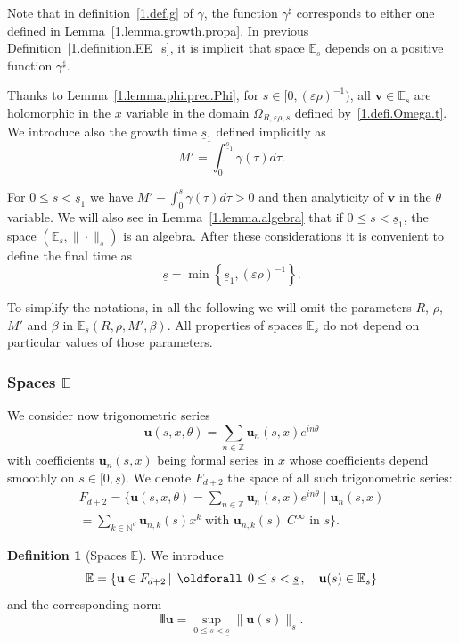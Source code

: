 \documentclass[10pt]{amsart}
\theoremstyle{definition}
\newtheorem{defi}[cdrthm]{Definition}
\theoremstyle{plain}
\newcommand*\e{\varepsilon}
\newcommand*\N{{\mathbb N}}
\newcommand*\Z{{\mathbb Z}}
\newcommand*\EE{{\mathbb E}}
\newcommand*\g{\gamma}
\newcommand{\ubf}{{\mathbf u}}
\newcommand{\vbf}{{\mathbf v}}
\newcommand*\und{\underline}
\DeclarePairedDelimiter{\VERT}{|\mkern -1.6mu|\mkern -1.6mu|}{|\mkern -1.6mu|\mkern -1.6mu|}
\renewcommand*{\forall}{\mathrel{\oldforall}}
\begin{document}
Note that in definition~\eqref{1.def.g} of $\g$, the function $\g^{\sharp}$ corresponds to either one defined in Lemma~\ref{1.lemma.growth.propa}. In previous Definition~\ref{1.definition.EE_s}, it is implicit that space $\EE_{s}$ depends on a positive function $\g^{\sharp}$.

Thanks to Lemma~\ref{1.lemma.phi.prec.Phi}, for $s\in[0,(\e\rho)^{-1})$, all $\vbf\in\EE_{s}$ are holomorphic in the $x$ variable in the domain $\Omega_{R,\e\rho,s}$ defined by~\eqref{1.defi.Omega.t}. We introduce also the growth time $\und{s}_1$ defined implicitly as 
\begin{equation}\label{1.def.und.s.1}
M' = \int_{0}^{\und{s}_1} \g(\tau) d\tau.
\end{equation}

For $0 \leq s < \und{s}_1$ we have $M' - \int_{0}^{s} \g(\tau)d\tau > 0$ and then analyticity of $\vbf$ in the $\theta$ variable. We will also see in Lemma~\ref{1.lemma.algebra} that if $0\leq s < \und{s}_1$, the space $(\EE_{s},\|\cdot\|_{s})$ is an algebra. After these considerations it is convenient to define the final time as
\begin{equation}\label{1.finaltime}
\und{s} = \min\left\{\und{s}_1, \left(\e\rho\right)^{-1}\right\}.
\end{equation}

To simplify the notations, in all the following we will omit the parameters $R$, $\rho$, $M'$ and $\beta$ in $\EE_{s}(R,\rho,M',\beta)$. All properties of spaces $\EE_{s}$ do not depend on particular values of those parameters.


\subsubsection{Spaces \texorpdfstring{$\EE$}{EE}}

We consider now trigonometric series
\[
\ubf(s,x,\theta) = \sum_{n\in\Z} \ubf_n(s,x) e^{in\theta}
\]
with coefficients $\ubf_n(s,x)$ being formal series in $x$ whose coefficients depend smoothly on $s\in[0,\und{s})$. We denote $F_{d+2}$ the space of all such trigonometric series:
\begin{multline*}
F_{d+2} = \bigg\{ \ubf(s,x,\theta) = \sum_{n\in\Z} \ubf_n(s,x) e^{in\theta} \;\Big|\; \ubf_n(s,x) \\
= \sum_{k\in\N^{d}} \ubf_{n,k}(s)x^{k} \; \text{with } \ubf_{n,k}(s) \;C^{\infty} \text{ in } s \bigg\}.
\end{multline*}

\begin{defi}[Spaces $\EE$]
We introduce
\begin{equation}\label{1.defi.space}
\EE = \left\{\ubf\in F_{d+2} \,|\, \forall \, 0\leq s <\und{s} \,, \quad \ubf(s)\in\EE_{s} \right\}
\end{equation}
and the corresponding norm
\begin{equation}\label{1.defi.norm}
\VERT{\ubf} = \sup_{0\leq s < \und{s}} \|\ubf(s)\|_s.
\end{equation}
\end{defi}
\end{document}
